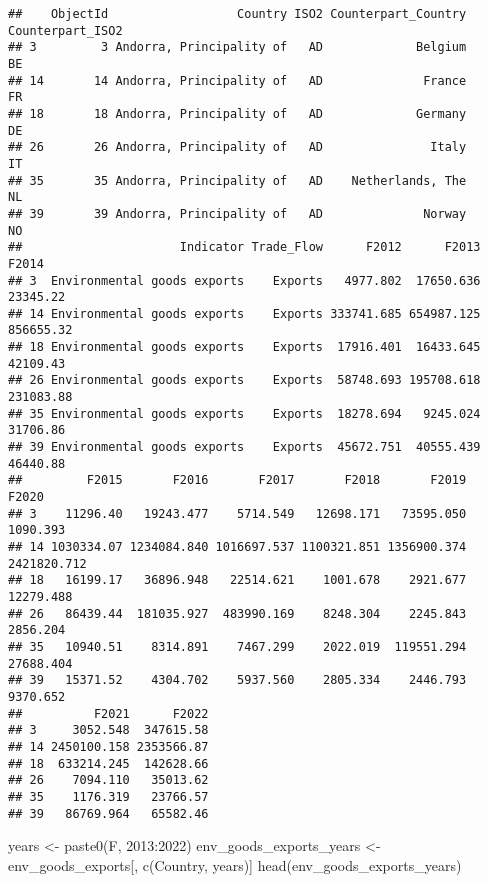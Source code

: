 \documentclass[
]{article}
\newenvironment{Shaded}{\begin{snugshade}}{\end{snugshade}}
\newcommand{\DecValTok}[1]{\textcolor[rgb]{0.00,0.00,0.81}{#1}}
\newcommand{\FunctionTok}[1]{\textcolor[rgb]{0.00,0.00,0.00}{#1}}
\newcommand{\NormalTok}[1]{#1}
\newcommand{\OtherTok}[1]{\textcolor[rgb]{0.56,0.35,0.01}{#1}}
\newcommand{\SpecialCharTok}[1]{\textcolor[rgb]{0.00,0.00,0.00}{#1}}
\newcommand{\StringTok}[1]{\textcolor[rgb]{0.31,0.60,0.02}{#1}}
\begin{document}
\begin{verbatim}
##    ObjectId                  Country ISO2 Counterpart_Country Counterpart_ISO2
## 3         3 Andorra, Principality of   AD             Belgium               BE
## 14       14 Andorra, Principality of   AD              France               FR
## 18       18 Andorra, Principality of   AD             Germany               DE
## 26       26 Andorra, Principality of   AD               Italy               IT
## 35       35 Andorra, Principality of   AD    Netherlands, The               NL
## 39       39 Andorra, Principality of   AD              Norway               NO
##                      Indicator Trade_Flow      F2012      F2013     F2014
## 3  Environmental goods exports    Exports   4977.802  17650.636  23345.22
## 14 Environmental goods exports    Exports 333741.685 654987.125 856655.32
## 18 Environmental goods exports    Exports  17916.401  16433.645  42109.43
## 26 Environmental goods exports    Exports  58748.693 195708.618 231083.88
## 35 Environmental goods exports    Exports  18278.694   9245.024  31706.86
## 39 Environmental goods exports    Exports  45672.751  40555.439  46440.88
##         F2015       F2016       F2017       F2018       F2019       F2020
## 3    11296.40   19243.477    5714.549   12698.171   73595.050    1090.393
## 14 1030334.07 1234084.840 1016697.537 1100321.851 1356900.374 2421820.712
## 18   16199.17   36896.948   22514.621    1001.678    2921.677   12279.488
## 26   86439.44  181035.927  483990.169    8248.304    2245.843    2856.204
## 35   10940.51    8314.891    7467.299    2022.019  119551.294   27688.404
## 39   15371.52    4304.702    5937.560    2805.334    2446.793    9370.652
##          F2021      F2022
## 3     3052.548  347615.58
## 14 2450100.158 2353566.87
## 18  633214.245  142628.66
## 26    7094.110   35013.62
## 35    1176.319   23766.57
## 39   86769.964   65582.46
\end{verbatim}

\begin{Shaded}
\begin{Highlighting}[]
\NormalTok{years }\OtherTok{\textless{}{-}} \FunctionTok{paste0}\NormalTok{(}\StringTok{\textquotesingle{}F\textquotesingle{}}\NormalTok{, }\DecValTok{2013}\SpecialCharTok{:}\DecValTok{2022}\NormalTok{)}
\NormalTok{env\_goods\_exports\_years }\OtherTok{\textless{}{-}}\NormalTok{ env\_goods\_exports[, }\FunctionTok{c}\NormalTok{(}\StringTok{\textquotesingle{}Country\textquotesingle{}}\NormalTok{, years)]}
\FunctionTok{head}\NormalTok{(env\_goods\_exports\_years)}
\end{Highlighting}
\end{Shaded}
\end{document}
